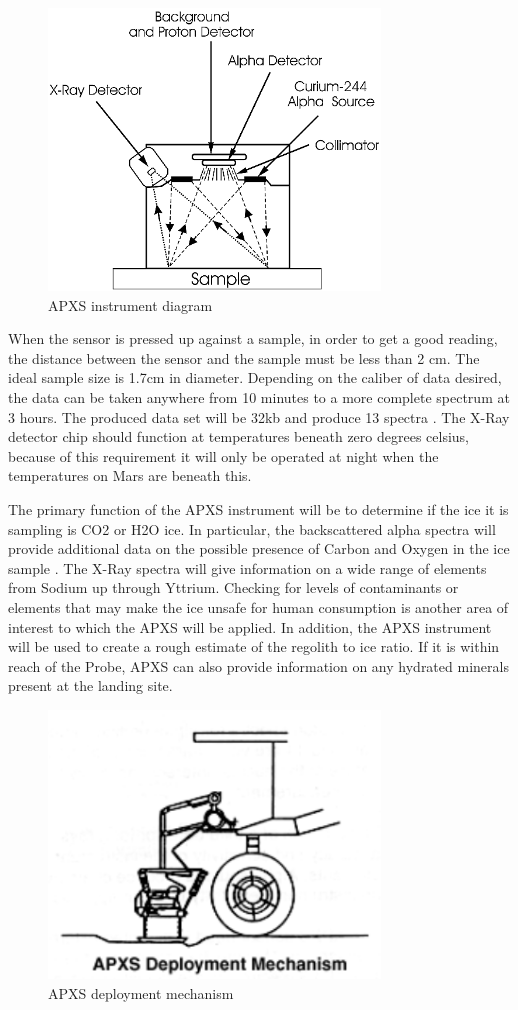 \documentclass[%
 portrait,
 aapm,
 mph,%
 amsmath,amssymb,
 reprint,%
]{revtex4-2}
\begin{document}
\begin{figure}[h!]
  \includegraphics[width=250pt]{Instruments/xAPXS.png}
   \caption{APXS instrument diagram \cite{bruckner2003refined}}
\end{figure} 

When the sensor is pressed up against a sample, in order to get a good reading, the distance between the sensor and the sample must be less than 2 cm. The ideal sample size is 1.7cm in diameter. Depending on the caliber of data desired, the data can be taken anywhere from 10 minutes to a more complete spectrum at 3 hours. The produced data set will be 32kb and produce 13 spectra \cite{APXSspaceflight101}. The X-Ray detector chip should function at temperatures beneath zero degrees celsius, because of this requirement it will only be operated at night when the temperatures on Mars are beneath this. 

The primary function of the APXS instrument will be to determine if the ice it is sampling is CO2 or H2O ice. In particular, the backscattered alpha spectra will provide additional data on the possible presence of Carbon and Oxygen in the ice sample \cite{rieder2003new}. The X-Ray spectra will give information on a wide range of elements from Sodium up through Yttrium. Checking for levels of contaminants or elements that may make the ice unsafe for human consumption is another area of interest to which the APXS will be applied. In addition, the APXS instrument will be used to create a rough estimate of the regolith to ice ratio. If it is within reach of the Probe, APXS can also provide information on any hydrated minerals present at the landing site. 
\begin{figure}[h!]
  \includegraphics[width=250pt]{Instruments/5_1_1_APXSDeployment.png}
   \caption{APXS deployment mechanism \cite{APXSdescription}}
\end{figure} 
\end{document}

